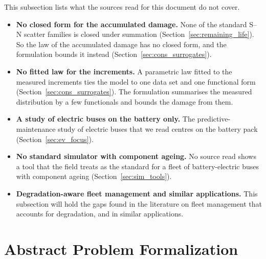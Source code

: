 \documentclass[11pt,a4paper]{article}
\theoremstyle{plain}
\theoremstyle{definition}
\theoremstyle{remark}
\begin{document}
This subsection lists what the sources read for this document do not cover.
\begin{itemize}
  \item \textbf{No closed form for the accumulated damage.} None of the standard S--N scatter families is closed under summation (Section~\ref{sec:remaining_life}).
    So the law of the accumulated damage has no closed form, and the formulation bounds it instead (Section~\ref{sec:cons_surrogates}).
  \item \textbf{No fitted law for the increments.} A parametric law fitted to the measured increments ties the model to one data set and one functional form (Section~\ref{sec:cons_surrogates}).
    The formulation summarises the measured distribution by a few functionals and bounds the damage from them.
  \item \textbf{A study of electric buses on the battery only.} The predictive-maintenance study of electric buses that we read centres on the battery pack~\cite[Secs.~2,~4.2]{Ibrahim2025} (Section~\ref{sec:ev_focus}).
  \item \textbf{No standard simulator with component ageing.} No source read shows a tool that the field treats as the standard for a fleet of battery-electric buses with component ageing (Section~\ref{sec:sim_tools}).
  \item \textbf{Degradation-aware fleet management and similar applications.} This subsection will hold the gaps found in the literature on fleet management that accounts for degradation, and in similar applications.
\end{itemize}

\section{Abstract Problem Formalization}
\label{sec:overview}
\end{document}
